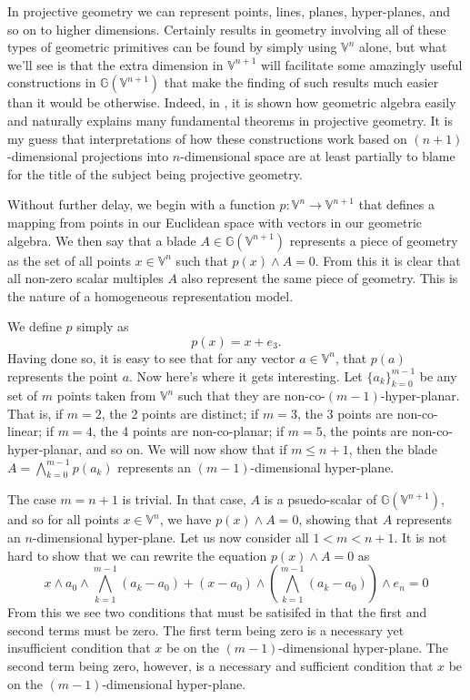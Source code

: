 \documentclass[12pt]{article}
\newcommand{\G}{\mathbb{G}}
\newcommand{\V}{\mathbb{V}}
\begin{document}
In projective geometry we can represent points, lines, planes, hyper-planes, and so on to higher dimensions.
Certainly results in geometry involving all of these types of geometric 
primitives can be found by simply using $\V^n$ alone, but what we'll see is that the extra dimension
in $\V^{n+1}$ will facilitate some amazingly useful constructions in $\G(\V^{n+1})$ that
make the finding of such results much easier than it would be otherwise.  Indeed, in
\cite{hestenes91}, it is shown how geometric algebra easily and naturally explains many
fundamental theorems in projective geometry.
It is my guess that interpretations of how these constructions work based on $(n+1)$-dimensional
projections into $n$-dimensional space are at least partially to blame for the title of the
subject being projective geometry.

Without further delay, we begin with a function $p:\V^n\to\V^{n+1}$ that defines
a mapping from points in our Euclidean space with vectors in our geometric algebra.
We then say that a blade $A\in\G(\V^{n+1})$ represents a piece of geometry as
the set of all points $x\in\V^n$ such that $p(x)\wedge A=0$.  From this it is clear
that all non-zero scalar multiples $A$ also represent the same piece of geometry.
This is the nature of a homogeneous representation model.

We define $p$ simply as
\begin{equation*}
p(x) = x + e_3.
\end{equation*}
Having done so, it is easy to see that for any vector $a\in\V^n$, that $p(a)$
represents the point $a$.  Now here's where it gets interesting.  Let $\{a_k\}_{k=0}^{m-1}$
be any set of $m$ points taken from $\V^n$ such that they are non-co-$(m-1)$-hyper-planar.
That is, if $m=2$, the 2 points are distinct; if $m=3$, the 3 points are non-co-linear; if
$m=4$, the 4 points are non-co-planar; if $m=5$, the points are non-co-hyper-planar, and so on.
We will now show that if $m\leq n+1$, then the blade $A=\bigwedge_{k=0}^{m-1}p(a_k)$ represents an
$(m-1)$-dimensional hyper-plane.

The case $m=n+1$ is trivial.  In that case, $A$ is a psuedo-scalar of $\G(\V^{n+1})$, and
so for all points $x\in\V^n$, we have $p(x)\wedge A=0$, showing that $A$ represents
an $n$-dimensional hyper-plane.  Let us now consider all $1<m<n+1$.  It is not hard to
show that we can rewrite the equation $p(x)\wedge A=0$ as
\begin{equation}\label{equ_hyper_plane}
x\wedge a_0\wedge\bigwedge_{k=1}^{m-1}(a_k-a_0) + (x-a_0)\wedge\left(\bigwedge_{k=1}^{m-1}(a_k-a_0)\right)\wedge e_n = 0
\end{equation}
From this we see two conditions that must be satisifed in that the first and second terms
must be zero.  The first term being zero is a necessary yet insufficient condition that $x$
be on the $(m-1)$-dimensional hyper-plane.  The second term being zero, however, is a
necessary and sufficient condition that $x$ be on the $(m-1)$-dimensional hyper-plane.
\end{document}

